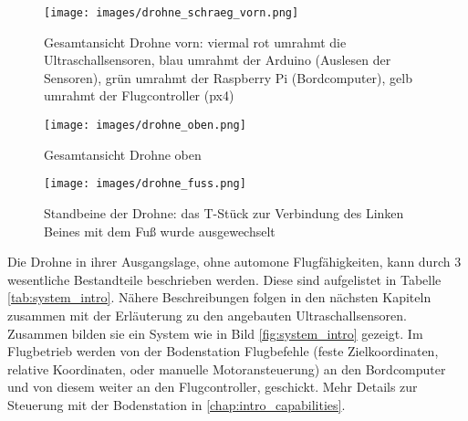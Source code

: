 \begin{figure}[h]
    \centering
    \texttt{[image: images/drohne\_schraeg\_vorn.png]}
    \caption[Gesamtansicht Drohne vorn]{Gesamtansicht Drohne vorn: viermal rot umrahmt die Ultraschallsensoren, blau umrahmt der Arduino (Auslesen der Sensoren), grün umrahmt der Raspberry Pi (Bordcomputer), gelb umrahmt der Flugcontroller (\acrshort{px4})}
    \label{fig:drohne_schraeg_vorn}
\end{figure}

\begin{figure}[h]
    \centering
    \texttt{[image: images/drohne\_oben.png]}
    \caption[Gesamtansicht Drohne oben]{Gesamtansicht Drohne oben}
    \label{fig:drohne_oben}
\end{figure}


\begin{figure}[h]
    \centering
    \texttt{[image: images/drohne\_fuss.png]}
    \caption[Standbeine der Drohne]{Standbeine der Drohne: das T-Stück zur Verbindung des Linken Beines mit dem Fuß wurde ausgewechselt}
    \label{fig:drohne_fuss}
\end{figure}

Die Drohne in ihrer Ausgangslage, ohne automone Flugfähigkeiten, kann durch 3 wesentliche Bestandteile beschrieben werden. Diese sind aufgelistet in Tabelle \ref{tab:system_intro}.
Nähere Beschreibungen folgen in den nächsten Kapiteln zusammen mit der Erläuterung zu den angebauten Ultraschallsensoren. Zusammen bilden sie ein System wie in Bild \ref{fig:system_intro} gezeigt. Im Flugbetrieb werden von der Bodenstation Flugbefehle (feste Zielkoordinaten, relative Koordinaten, oder manuelle Motoransteuerung) an den Bordcomputer und von diesem weiter an den Flugcontroller, geschickt. Mehr Details zur Steuerung mit der Bodenstation in \cref{chap:intro_capabilities}.

